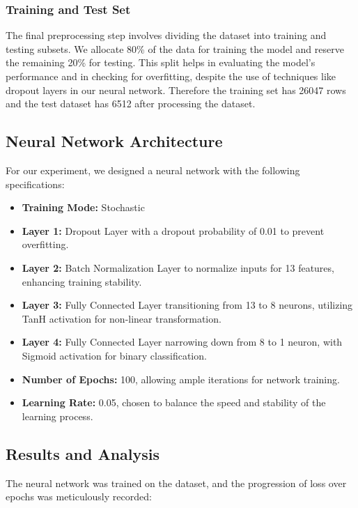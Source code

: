 \documentclass{article}
\begin{document}
\subsubsection{Training and Test Set}

The final preprocessing step involves dividing the dataset into training and testing subsets. We allocate 80\% of the data for training the model and reserve the remaining 20\% for testing. This split helps in evaluating the model's performance and in checking for overfitting, despite the use of techniques like dropout layers in our neural network. Therefore the training set has 26047 rows and the test dataset has 6512 after processing the dataset.

\subsection{Neural Network Architecture}

For our experiment, we designed a neural network with the following specifications:

\begin{itemize}
    \item \textbf{Training Mode:} Stochastic
    \item \textbf{Layer 1:} Dropout Layer with a dropout probability of 0.01 to prevent overfitting.
    \item \textbf{Layer 2:} Batch Normalization Layer to normalize inputs for 13 features, enhancing training stability.
    \item \textbf{Layer 3:} Fully Connected Layer transitioning from 13 to 8 neurons, utilizing TanH activation for non-linear transformation.
    \item \textbf{Layer 4:} Fully Connected Layer narrowing down from 8 to 1 neuron, with Sigmoid activation for binary classification.
    \item \textbf{Number of Epochs:} 100, allowing ample iterations for network training.
    \item \textbf{Learning Rate:} 0.05, chosen to balance the speed and stability of the learning process.
\end{itemize}

\subsection{Results and Analysis}

The neural network was trained on the dataset, and the progression of loss over epochs was meticulously recorded:
\end{document}
